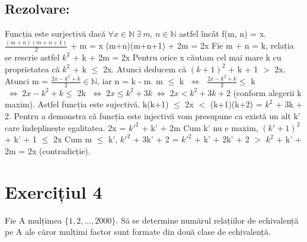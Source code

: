 \documentclass{article}
\DeclareRobustCommand\iff{\;\Longleftrightarrow\;}
\begin{document}
\subsection{Rezolvare:}
Funcția este surjectivă dacă $\forall x \in \mathbb{N} \ \exists \ m,\, n \in \mathbb{N} $ astfel încât f(m, n) = x. 
$\frac{(m+n)(m+n+1)}{2}$ + m = x
\newline
(m+n)(m+n+1) + 2m = 2x
\newline
Fie m + n = k, relația se rescrie astfel 
$k^2$ + k + 2m = 2x
\newline
Pentru orice x căutam cel mai mare k cu proprietatea că $k^2$ + k $\leq$ 2x. Atunci deducem că $(k + 1)^2$ + k + 1 $>$ 2x.
Atunci m = $\frac{2x - k^2 + k}{2} \in \mathbb{N}$, iar n = k - m. 
\newline
m $\leq$ k $\iff$ $\frac{2x - k^2 + k}{2} \leq $ k $\iff 2x - k^2 + k \leq$ 2k $\iff 2x \leq k^2 + 3k \iff 2x < k^2 + 3k + 2$ (conform alegerii k maxim).
\newline
Astfel funcția este sujectivă.
\newline
k(k+1) $\leq$ 2x $<$ (k+1)(k+2) = $k^2$ + 3k + 2.
\newline
Pentru a demonstra că funcția este injectivă vom presupune ca există un alt k' care îndeplinește egalitatea.
\newline
2x = $k'^2$ + k' + 2m
\newline
Cum k' nu e maxim, $(k' + 1)^2$ + k' + 1 $\leq$ 2x
\newline
Cum m  $\leq$ k',
$k'^2$ + 3k' + 2 = $k'^2$ + k' + 2k' + 2 $>$ $k^2$ + k' + 2m = 2x (contradicție).

\section{Exercițiul 4}
Fie A mulțimea $\{1, 2, ..., 2000\}$. Să se determine numărul relațiilor de echivalență pe A ale căror mulțimi factor sunt formate din două clase de echivalență.
\end{document}

